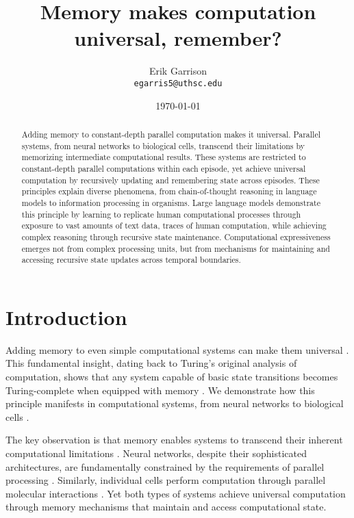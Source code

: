 \documentclass[12pt]{article}
\title{Memory makes computation universal, remember?}
\author{Erik Garrison\\
  \texttt{egarris5@uthsc.edu}\\[1ex]
  }
\date{\today}
\begin{document}
\maketitle

\begin{abstract}
Adding memory to constant-depth parallel computation makes it universal.
Parallel systems, from neural networks to biological cells, transcend their limitations by memorizing intermediate computational results.
These systems are restricted to constant-depth parallel computations within each episode, yet achieve universal computation by recursively updating and remembering state across episodes.
These principles explain diverse phenomena, from chain-of-thought reasoning in language models to information processing in organisms.
Large language models demonstrate this principle by learning to replicate human computational processes through exposure to vast amounts of text data, traces of human computation, while achieving complex reasoning through recursive state maintenance.
Computational expressiveness emerges not from complex processing units, but from mechanisms for maintaining and accessing recursive state updates across temporal boundaries.
\end{abstract}

\section{Introduction}
Adding memory to even simple computational systems can make them universal \cite{merrill2023parallelism,peng2024limitations}. This fundamental insight, dating back to Turing's original analysis of computation, shows that any system capable of basic state transitions becomes Turing-complete when equipped with memory \cite{swamy1983space,bisaz2024memory}. We demonstrate how this principle manifests in computational systems, from neural networks to biological cells \cite{wang2023parallel}.

The key observation is that memory enables systems to transcend their inherent computational limitations \cite{barrett2019analyzing,ganguli2018intertwined}. Neural networks, despite their sophisticated architectures, are fundamentally constrained by the requirements of parallel processing \cite{cai2024efficient}. Similarly, individual cells perform computation through parallel molecular interactions \cite{fu2023scgrn,hoel2020emergence}. Yet both types of systems achieve universal computation through memory mechanisms that maintain and access computational state.
\end{document}
